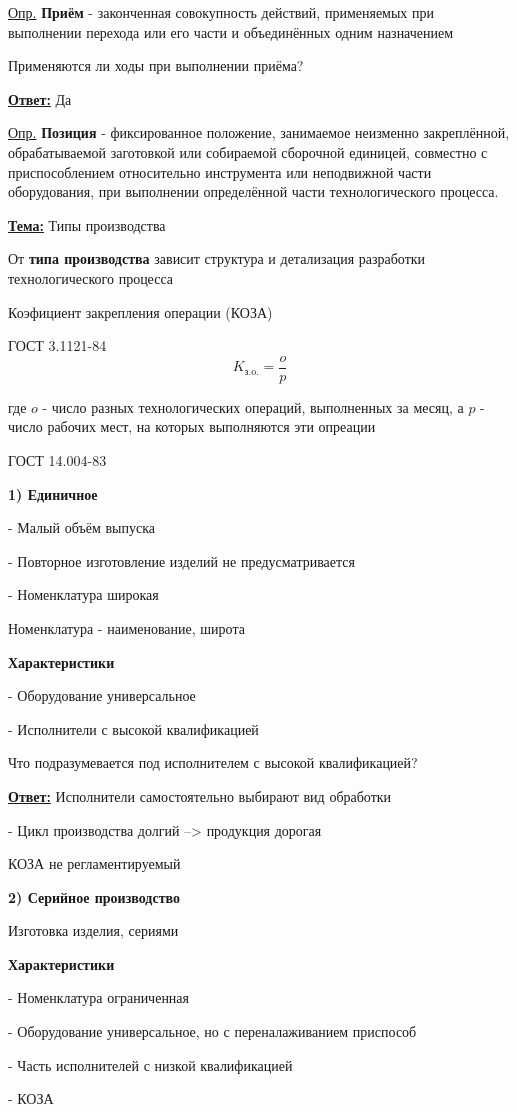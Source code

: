 {\begin{center}
    \par\underline{Опр.} \textbf{Приём} - законченная совокупность действий, применяемых при выполнении перехода или его части и объединённых одним назначением
    \par * Применяются ли ходы при выполнении приёма?
    \par\underline{\textbf{Ответ:}} Да
    
    \par\underline{Опр.} \textbf{Позиция} - фиксированное положение, занимаемое неизменно закреплённой, обрабатываемой заготовкой или собираемой сборочной единицей, совместно с приспособлением относительно инструмента или неподвижной части оборудования, при выполнении определённой части технологического процесса.
    \par\underline{\textbf{Тема:}} Типы производства
    \par * От \textbf{типа производства} зависит структура и детализация разработки технологического процесса
    \par * Коэфициент закрепления операции (КОЗА)
    \par ГОСТ 3.1121-84
    $$K_\text{з.o.}=\frac{o}{p}$$
    \par где $o$ - число разных технологических операций, выполненных за месяц, а $p$ - число рабочих мест, на которых выполняются эти опреации
    \par ГОСТ 14.004-83
    \par\textbf{1) Единичное}
    \par - Малый объём выпуска
    \par - Повторное изготовление изделий не предусматривается
    \par - Номенклатура широкая
    \par Номенклатура - наименование, широта
    \par\textbf{Характеристики}
    \par - Оборудование универсальное
    \par - Исполнители с высокой квалификацией
    \par * Что подразумевается под исполнителем с высокой квалификацией?
    \par\underline{\textbf{Ответ:}} Исполнители самостоятельно выбирают вид обработки
    \par - Цикл производства долгий --> продукция дорогая
    \par КОЗА не регламентируемый
    \par\textbf{2) Серийное производство}
    \par Изготовка изделия, сериями
    \par\textbf{Характеристики}
    \par - Номенклатура ограниченная
    \par - Оборудование универсальное, но с переналаживанием приспособ
    \par - Часть исполнителей с низкой квалификацией
    \par - КОЗА
    

\end{center}}
